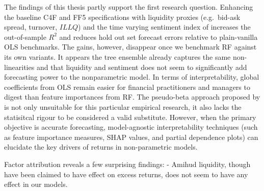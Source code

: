 The findings of this thesis partly support the first research question. Enhancing the baseline C4F and  FF5 specifications with liquidity proxies (e.g.\ bid-ask spread, turnover, $ILLQ$) and the time varying sentiment index of  increases the out-of-sample $R^{2}$ and reduces hold out set forecast errors relative to plain-vanilla OLS benchmarks.  The gains, however, disappear once we benchmark RF against its own variants. It appears the tree ensemble already captures the same non-linearities and that liquidity and sentiment does not seem to significantly add forecasting power to the nonparametric model. In terms of interpretability, global coefficients from OLS remain easier for financial practitioners and managers to digest than feature importances from RF. The pseudo-beta approach proposed by  is not only unsuitable for this particular empirical research, it also lacks the statisitcal rigour to be considered a valid substitute. However, when the primary objective is accurate forecasting, model-agnostic interpretability techniques (such as feature importance measures, SHAP values, and partial dependence plots) can elucidate the key drivers of returns in non-parametric models.

Factor attribution reveals a few surprising findings:
- Amihud liquidity, though have been claimed to have effect on excess returns, does not seem to have any effect in our models. \cite{chordia_2017}


